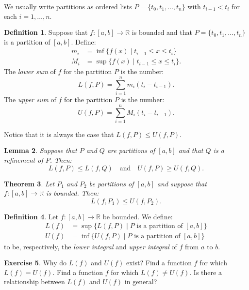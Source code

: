 \documentclass[12pt]{article}
\newcommand{\bbR}{\mathbb{R}}
\providecommand{\arr}{\longrightarrow}
\renewcommand{\_}[1]{\underline{ #1 }}
\newtheorem{theorem}{Theorem}[section]
\newtheorem{lemma}[theorem]{Lemma}
\theoremstyle{definition}
\newtheorem{definition}[theorem]{Definition}
\newtheorem{exercise}[theorem]{Exercise}
\numberwithin{equation}{subsection}
\begin{document}
We usually write partitions as ordered lists $P = \{t_0, t_1, \dotsc, t_n\}$ with $t_{i - 1} < t_{i}$ for each $i=1,\ldots, n$.




\begin{definition}  Suppose that $f \colon [a, b] \arr \bbR$ is bounded and that $P = \{t_0, t_1, \dotsc, t_n\}$ is a partition of $[a, b]$.  Define:
\begin{align*}
m_i &= \inf \{ f(x) \mid t_{i - 1} \leq x \leq  t_i \} \\
M_i &= \sup \{ f(x) \mid t_{i - 1} \leq x \leq  t_i \}.
\end{align*}
The \emph{lower sum} of $f$ for the partition $P$ is the number:
\[
L(f, P) = \sum_{i = 1}^n m_i (t_i - t_{i - 1}).
\]
The \emph{upper sum} of $f$ for the partition $P$ is the number:
\[
U(f, P) = \sum_{i = 1}^n M_i (t_i - t_{i - 1}).
\]
\end{definition}

\noindent Notice that it is always the case that $L(f, P) \leq U(f, P)$.  

\begin{lemma}  Suppose that $P$ and $Q$ are partitions of $[a, b]$ and that $Q$ is a refinement of $P$.
Then:
\[
L(f, P) \leq L(f, Q)  \quad \text{and} \quad U(f, P) \geq U(f, Q).
\]
\end{lemma}

\begin{theorem}  Let $P_1$ and $P_2$ be partitions of $[a, b]$ and suppose that $f \colon [a, b] \arr \bbR$ is bounded.  Then:
\[
L(f, P_1) \leq U(f, P_2).
\]
\end{theorem}

\begin{definition}  Let $f:[a,b]\rightarrow\bbR$ be bounded.  We define:
\begin{align*}
L(f) &= \sup \{ L(f, P) \mid \text{$P$ is a partition of $[a, b]$} \} \\
U(f) &= \inf \{ U(f, P) \mid \text{$P$ is a partition of $[a, b]$} \}
\end{align*}
to be, respectively, the \emph{lower integral} and \emph{upper integral} of $f$ from $a$ to $b$.
\end{definition}

\begin{exercise}  Why do $L(f)$ and $U(f)$ exist?  Find a function $f$ for which $L(f) = U(f)$.  Find a function $f$ for which $L(f) \neq U(f)$.  Is there a relationship between $L(f)$ and $U(f)$ in general?
\end{exercise}
\end{document}
